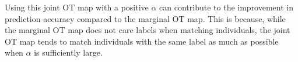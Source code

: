 \documentclass[10pt]{article} %
\begin{document}

Using this joint OT map with a positive $\alpha$ can contribute to the improvement in prediction accuracy compared to the marginal OT map.
This is because, while the marginal OT map does not care labels when matching individuals, the joint OT map tends to match individuals with the same label as much as possible when $\alpha$ is sufficiently large.
\end{document}
